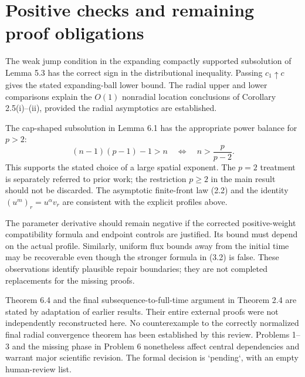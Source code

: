 \documentclass[10pt]{article}
\begin{document}
\section*{Positive checks and remaining proof obligations}
The weak jump condition in the expanding compactly supported subsolution of Lemma 5.3 has the correct sign in the distributional inequality. Passing \(c_1\uparrow c\) gives the stated expanding-ball lower bound. The radial upper and lower comparisons explain the \(O(1)\) nonradial location conclusions of Corollary 2.5(i)–(ii), provided the radial asymptotics are established.\par
The cap-shaped subsolution in Lemma 6.1 has the appropriate power balance for \(p>2\): \[(n-1)(p-1)-1>n
 \quad\Longleftrightarrow\quad n>\frac p{p-2}.\] This supports the stated choice of a large spatial exponent. The \(p=2\) treatment is separately referred to prior work; the restriction \(p\geq2\) in the main result should not be discarded. The asymptotic finite-front law (2.2) and the identity \((u^m)_r=u^\alpha v_r\) are consistent with the explicit profiles above.\par
The parameter derivative should remain negative if the corrected positive-weight compatibility formula and endpoint controls are justified. Its bound must depend on the actual profile. Similarly, uniform flux bounds away from the initial time may be recoverable even though the stronger formula in (3.2) is false. These observations identify plausible repair boundaries; they are not completed replacements for the missing proofs.\par
Theorem 6.4 and the final subsequence-to-full-time argument in Theorem 2.4 are stated by adaptation of earlier results. Their entire external proofs were not independently reconstructed here. No counterexample to the correctly normalized final radial convergence theorem has been established by this review. Problems 1–3 and the missing phase in Problem 6 nonetheless affect central dependencies and warrant major scientific revision. The formal decision is `pending`, with an empty human-review list.\par
\end{document}
